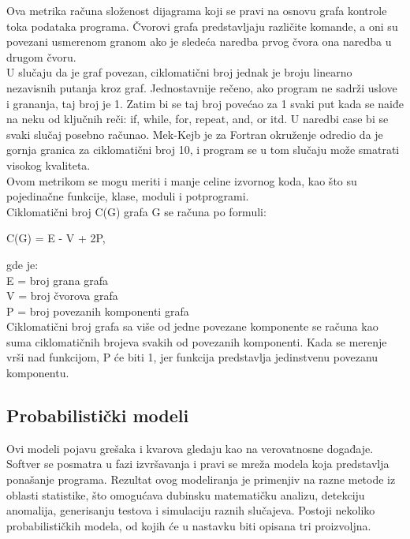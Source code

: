 \documentclass[a4paper]{article}
\begin{document}
Ova metrika računa složenost dijagrama koji se pravi na osnovu grafa kontrole toka podataka programa. Čvorovi grafa predstavljaju različite komande, a oni su povezani usmerenom granom ako je sledeća naredba prvog čvora ona naredba u drugom čvoru. \\
U slučaju da je graf povezan, ciklomatični broj jednak je broju linearno nezavisnih putanja kroz graf. Jednostavnije rečeno, ako program ne sadrži uslove i grananja, taj broj je 1. Zatim bi se taj broj povećao za 1 svaki put kada se naiđe na neku od ključnih reči: if, while, for, repeat, and, or itd. U naredbi case bi se svaki slučaj posebno računao. Mek-Kejb je za Fortran okruženje odredio da je gornja granica za ciklomatični broj 10, i program se u tom slučaju može smatrati visokog kvaliteta.\cite{mccabe_fortran}\\
Ovom metrikom se mogu meriti i manje celine izvornog koda, kao što su pojedinačne funkcije, klase, moduli i potprogrami.\\
Ciklomatični broj C(G) grafa G se računa po formuli:
\begin{center}
C(G) = E - V + 2P,
\end{center}
gde je:\\
E = broj grana grafa\\
V = broj čvorova grafa\\
P = broj povezanih komponenti grafa\\

Ciklomatični broj grafa sa više od jedne povezane komponente se računa kao suma ciklomatičnih brojeva svakih od povezanih komponenti. Kada se merenje vrši nad funkcijom,  P će biti 1, jer funkcija predstavlja jedinstvenu povezanu komponentu.\\

\subsection{Probabilistički modeli}
\label{sec:probabilisticki}

Ovi modeli pojavu grešaka i kvarova gledaju kao na verovatnosne događaje. Softver se posmatra u fazi izvršavanja i pravi se mreža modela koja predstavlja ponašanje programa. Rezultat ovog modeliranja je primenjiv na razne metode iz oblasti statistike, što omogućava dubinsku matematičku analizu, detekciju anomalija, generisanju testova i simulaciju raznih slučajeva. Postoji nekoliko probabilističkih modela, od kojih će u nastavku biti opisana tri proizvoljna. \\
\end{document}
